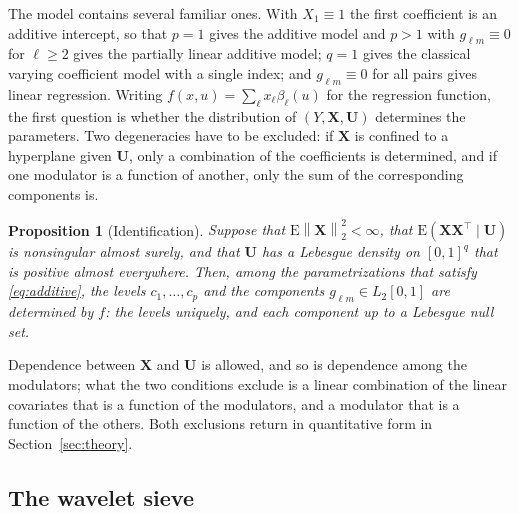 \documentclass[12pt]{article} %
\newtheorem{proposition}{Proposition}
\theoremstyle{definition}
\newcommand{\E}{\mathrm{E}}
\newcommand{\T}{^{\top}}
\newcommand{\norm}[1]{\left\lVert #1 \right\rVert}
\newcommand{\cv}{\ell}
\newcommand{\md}{m}
\newcommand{\bX}{\mathbf{X}}
\newcommand{\bU}{\mathbf{U}}
\newcommand{\fcoef}[1]{\beta_{#1}}
\newcommand{\lvl}[1]{c_{#1}}
\newcommand{\gcomp}[2]{g_{#1#2}}
\begin{document}
The model contains several familiar ones. With $X_1 \equiv 1$ the first
coefficient is an additive intercept, so that $p = 1$ gives the additive model
and $p > 1$ with $\gcomp{\cv}{\md} \equiv 0$ for $\cv \ge 2$ gives the
partially linear additive model; $q = 1$ gives the classical varying
coefficient model with a single index; and $\gcomp{\cv}{\md}\equiv 0$ for all
pairs gives linear regression. Writing
$f(x,u) = \sum_{\cv} x_{\cv}\fcoef{\cv}(u)$ for the regression function, the
first question is whether the distribution of $(Y,\bX,\bU)$ determines the
parameters. Two degeneracies have to be excluded: if $\bX$ is confined to a
hyperplane given $\bU$, only a combination of the coefficients is determined,
and if one modulator is a function of another, only the sum of the
corresponding components is.

\begin{proposition}[Identification]
\label{prop:identif}
Suppose that $\E\norm{\bX}_2^2 < \infty$, that $\E(\bX\bX\T \mid \bU)$ is
nonsingular almost surely, and that $\bU$ has a Lebesgue density on $[0,1]^q$
that is positive almost everywhere. Then, among the parametrizations that
satisfy \eqref{eq:additive}, the levels $\lvl{1},\dots,\lvl{p}$ and the
components $\gcomp{\cv}{\md} \in L_2[0,1]$ are determined by $f$: the levels
uniquely, and each component up to a Lebesgue null set.
\end{proposition}

Dependence between $\bX$ and $\bU$ is allowed, and so is dependence among the
modulators; what the two conditions exclude is a linear combination of the
linear covariates that is a function of the modulators, and a modulator that
is a function of the others. Both exclusions return in quantitative form in
Section~\ref{sec:theory}.

\subsection{The wavelet sieve}
\label{sec:sieve}
\end{document}
